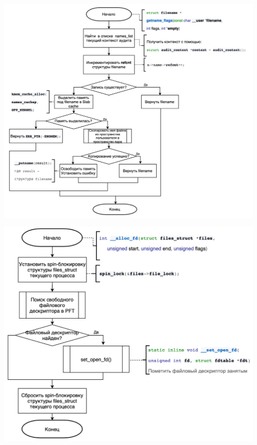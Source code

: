 \documentclass[12pt]{report}
\begin{document}
\begin{center}
		\includegraphics[scale=0.75]{pics/part3.png}
\end{center}

\begin{center}
		\includegraphics[scale=0.75]{pics/part4.png}
\end{center}
\end{document}
